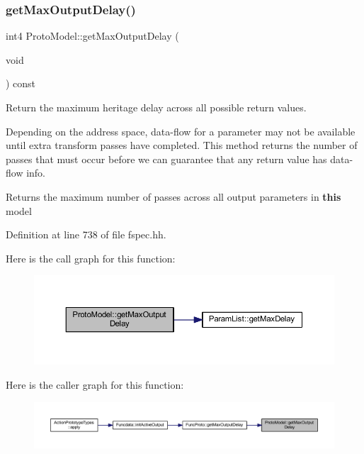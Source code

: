 \subsubsection{\texorpdfstring{getMaxOutputDelay()}{getMaxOutputDelay()}}
{\footnotesize\ttfamily int4 Proto\+Model\+::get\+Max\+Output\+Delay (\begin{DoxyParamCaption}\item[{void}]{ }\end{DoxyParamCaption}) const\hspace{0.3cm}{\ttfamily [inline]}}



Return the maximum heritage delay across all possible return values. 

Depending on the address space, data-\/flow for a parameter may not be available until extra transform passes have completed. This method returns the number of passes that must occur before we can guarantee that any return value has data-\/flow info. \begin{DoxyReturn}{Returns}
the maximum number of passes across all output parameters in {\bfseries{this}} model 
\end{DoxyReturn}


Definition at line 738 of file fspec.\+hh.

Here is the call graph for this function\+:
\nopagebreak
\begin{figure}[H]
\begin{center}
\leavevmode
\includegraphics[width=350pt]{class_proto_model_a6692a33595e306f23f23d98093a006bf_cgraph}
\end{center}
\end{figure}
Here is the caller graph for this function\+:
\nopagebreak
\begin{figure}[H]
\begin{center}
\leavevmode
\includegraphics[width=350pt]{class_proto_model_a6692a33595e306f23f23d98093a006bf_icgraph}
\end{center}
\end{figure}
\mbox{\label{class_proto_model_a19f8d9a9dbc7fb8d52aa180410cddc8b}} 
